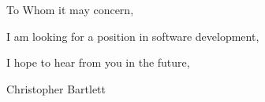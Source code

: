 \documentclass{resume} %
\begin{document}
\vspace{0.50 in}

To Whom it may concern,

\vspace{0.50 in}
\quad I am looking for a position in software development, 

\vspace{0.50 in}

I hope to hear from you in the future, 


\quad Christopher Bartlett



\end{document}

